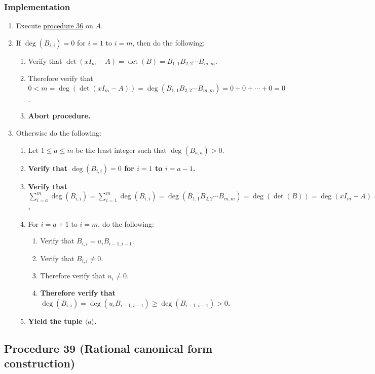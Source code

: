 \documentclass[twocolumn]{article}
\begin{document}
			\subsubsection{Implementation}
				\begin{enumerate}
					\item Execute \hyperref[sec:procedure 36]{procedure 36} on $A$.
					\item If $\deg(B_{i,i})=0$ for $i=1$ to $i=m$, then do the following:
					\begin{enumerate}
						\item Verify that $\det(xI_m-A)=\det(B)=B_{1,1}B_{2,2}\cdots B_{m,m}$.
						\item Therefore verify that $0<m=\deg(\det(xI_m-A))=\deg(B_{1,1}B_{2,2}\cdots B_{m,m})=0+0+\cdots+0=0$.
						\item \textbf{Abort procedure.}
					\end{enumerate}
					\item Otherwise do the following:
					\begin{enumerate}
						\item Let $1\le a\le m$ be the least integer such that $\deg(B_{a,a})>0$.
						\item \textbf{Verify that $\deg(B_{i,i})=0$ for $i=1$ to $i=a-1$.}
						\item \textbf{Verify that $\sum_{i=a}^m\deg(B_{i,i})=\sum_{i=1}^m\deg(B_{i,i})=\deg(B_{1,1}B_{2,2}\cdots B_{m,m})=\deg(\det(B))=\deg(xI_m-A)=m$.}
						\item For $i=a+1$ to $i=m$, do the following:
						\begin{enumerate}
							\item Verify that $B_{i,i}=u_iB_{i-1,i-1}$.
							\item Verify that $B_{i,i}\ne 0$.
							\item Therefore verify that $u_i\ne 0$.
							\item \textbf{Therefore verify that $\deg(B_{i,i})=\deg(u_iB_{i-1,i-1})\ge\deg(B_{i-1,i-1})>0$.}
						\end{enumerate}
						\item \textbf{Yield the tuple $\langle a\rangle$.}
					\end{enumerate}
				\end{enumerate}
		\subsection{Procedure 39 (Rational canonical form construction)}\label{sec:procedure 39}
\end{document}
